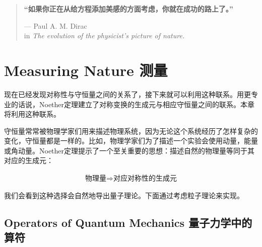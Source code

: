 


\begin{quote}%
{\bfseries “如果你正在从给方程添加美感的方面考虑，你就在成功的路上了。”}


\begin{flushright}
--- Paul A. M. Dirac\\
in {\itshape The evolution of the
physicist's picture of nature.}
\end{flushright}
\end{quote}

\chapter[测量]{Measuring Nature 测量}\label{chap5}

现在已经发现对称性与守恒量之间的关系了，接下来就可以利用这种联系。用更专业的话说，Noether定理建立了对称变换的生成元与相应守恒量之间的联系。本章将利用这种联系。

守恒量常常被物理学家们用来描述物理系统，因为无论这个系统经历了怎样复杂的变化，守恒量都是一样的。比如，物理学家们为了描述一个实验会使用动量，能量或角动量。Noether定理提示了一个至关重要的思想：描述自然的物理量等同于其对应的生成元：

\begin{align}\label{equ5.1}
\text{物理量}\Rightarrow\text{对应对称性的生成元}
\end{align}

我们会看到这种选择会自然地导出量子理论。下面通过考虑粒子理论来实现。

\section[量子力学中的算符]{Operators of Quantum Mechanics 量子力学中的算符}\label{sec5.1}

